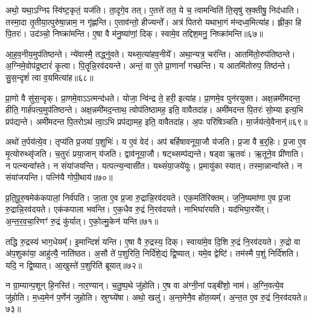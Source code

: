 अथो॒ यथा॒\-ऽग्निꣴ स्वि॑ष्ट॒कृतं॒ यज॑ति।
ता॒दृगे॒व तत्।
ए॒तत्ते॑ तत॒ ये च॒ त्वामन्विति॑ ति॒सृषु॑ स्र॒क्तीषु॒ निद॑धाति।
तस्मा॒दा तृ॒तीया॒त्पुरु॑षा॒न्नाम॒ न गृ॑ह्णन्ति।
ए॒ताव॑न्तो॒ हीज्यन्ते᳚।
अत्र॑ पितरो यथाभा॒गं म॑न्दध्व॒मित्या॑ह।
ह्लीका॒ हि पि॒तरः॑।
उद॑ञ्चो॒ निष्क्रा॑मन्ति।
ए॒षा वै म॑नु॒ष्या॑णां॒ दिक्।
स्वामे॒व तद्दिश॒मनु॒ निष्क्रा॑मन्ति॥६७॥\ip

आ॒ह॒व॒नीय॒मुप॑तिष्ठन्ते।
न्ये॑वास्मै॒ तद्ध्नु॑वते।
यथ्स॒त्या॑हव॒नीये᳚।
अथा॒न्यत्र॒ चर॑न्ति।
आतमि॑तो॒रुप॑तिष्ठन्ते।
अ॒ग्निमे॒वोप॑द्र॒ष्टारं॑ कृ॒त्वा।
पि॒तॄन्नि॒रव॑दयन्ते।
अन्तं॒ वा ए॒ते प्रा॒णानां᳚ गच्छन्ति।
य आतमि॑तोरुप॒ तिष्ठ॑न्ते।
सु॒स॒न्दृशं॑ त्वा व॒यमित्या॑ह॥६८॥\ip

प्रा॒णो वै सु॑स॒न्दृक्।
प्रा॒णमे॒वाऽऽत्मन्द॑धते।
योजा॒ न्वि॑न्द्र ते॒ हरी॒ इत्या॑ह।
प्रा॒णमे॒व पुन॑रयुक्त।
अक्ष॒न्नमी॑मदन्त॒ हीति॒ गार्\mbox{}ह॑पत्य॒मुप॑तिष्ठन्ते।
अक्ष॒न्नमी॑मद॒न्ताथ॒ त्वोप॑तिष्ठामह॒ इति॒ वावैतदा॑ह।
अमी॑मदन्त पि॒तरः॑ सो॒म्या इत्य॒भि प्रप॑द्यन्ते।
अमी॑मदन्त पि॒तरोऽथ॑ त्वा॒ऽभि प्रप॑द्यामह॒ इति॒ वावैतदा॑ह।
अ॒पः परि॑षिञ्चति।
मा॒र्जय॑त्ये॒वैनान्॑॥६९॥\ip

अथो॑ त॒र्पय॑त्ये॒व।
तृप्य॑ति प्र॒जया॑ प॒शुभिः॑।
य ए॒वं वेद॑।
अप॑ बर्\mbox{}हिषावनूया॒जौ य॑जति।
प्र॒जा वै ब॒र्॒हिः।
प्र॒जा ए॒व मृ॒त्योरुथ्सृ॑जति।
च॒तुरः॑ प्रया॒जान् य॑जति।
द्वाव॑नूया॒जौ।
षट्थ्सम्प॑द्यन्ते।
षड्वा ऋ॒तवः॑।
ऋ॒तूने॒व प्री॑णाति।
न पत्न्यन्वा᳚स्ते।
न संया॑जयन्ति।
यत्पत्न्य॒न्वासी॑त।
यथ्सं॑या॒जये॑युः।
प्र॒मायु॑का स्यात्।
तस्मा॒न्नान्वा᳚स्ते।
न संया॑जयन्ति।
पत्नि॑यै गोपी॒थाय॑॥७०॥\ip{}

प्र॒ति॒पू॒रु॒षमेक॑कपालां॒ निर्व॑पति।
जा॒ता ए॒व प्र॒जा रु॒द्रान्नि॒रव॑दयते।
एक॒मति॑रिक्तम्।
ज॒नि॒ष्यमा॑णा ए॒व प्र॒जा रु॒द्रान्नि॒रव॑दयते।
एक॑कपाला भवन्ति।
ए॒क॒धैव रु॒द्रं नि॒रव॑दयते।
नाभिघा॑रयति।
यद॑भिघा॒रये᳚त्।
अ॒न्त॒र॒व॒चा॒रिणꣳ॑ रु॒द्रं कु॑र्यात्।
ए॒को॒ल्मु॒केन॑ यन्ति॥७१॥\ip

तद्धि रु॒द्रस्य॑ भाग॒धेयम्᳚।
इ॒मान्दिशं॑ यन्ति।
ए॒षा वै रु॒द्रस्य॒ दिक्।
स्वाया॑मे॒व दि॒शि रु॒द्रं नि॒रव॑दयते।
रु॒द्रो वा अ॑प॒शुका॑या॒ आहु॑त्यै॒ नाति॑ष्ठत।
अ॒सौ ते॑ प॒शुरिति॒ निर्दि॑शे॒द्यं द्वि॒ष्यात्।
यमे॒व द्वेष्टि॑।
तम॑स्मै प॒शुं निर्दि॑शति।
यदि॒ न द्वि॒ष्यात्।
आ॒खुस्ते॑ प॒शुरिति॑ ब्रूयात्॥७२॥\ip

न ग्रा॒म्यान्प॒शून् हि॒नस्ति॑।
नार॒ण्यान्।
च॒तु॒ष्प॒थे जु॑होति।
ए॒ष वा अ॑ग्नी॒नां पड्बी॑शो॒ नाम॑।
अ॒ग्नि॒वत्ये॒व जु॑होति।
म॒ध्य॒मेन॑ प॒र्णेन॑ जुहोति।
स्रुग्घ्ये॑षा।
अथो॒ खलु॑।
अ॒न्त॒मेनै॒व हो॑त॒व्यम्᳚।
अ॒न्त॒त ए॒व रु॒द्रं नि॒रव॑दयते॥७३॥\ip

